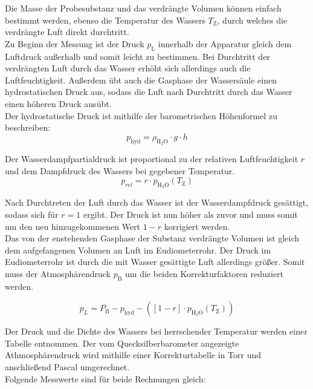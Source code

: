 \documentclass[12pt,a4paper,titlepage,headinclude,bibtotoc]{scrartcl}
\begin{document}
Die Masse der Probesubstanz und das verdrängte Volumen können einfach bestimmt werden, ebenso die Temperatur des Wassers $T_\mathrm{Z}$, durch welches die verdrängte Luft direkt durchtritt. \\
Zu Beginn der Messung ist der Druck $p_\mathrm{L}$ innerhalb der Apparatur gleich dem Luftdruck außerhalb und somit leicht zu bestimmen. Bei Durchtritt der verdrängten Luft durch das Wasser erhöht sich allerdings auch die Luftfeuchtigkeit. Außerdem übt auch die Gasphase der Wassersäule einen hydrostatischen Druck aus, sodass die Luft nach Durchtritt durch das Wasser einen höheren Druck ausübt. \\
Der hydrostatische Druck ist mithilfe der barometrischen Höhenformel zu beschreiben:\\

\begin{equation}
p_\mathrm{hyd}= \rho_\mathrm{H_2O} \cdot g \cdot h
\end{equation}

Der Wasserdampfpartialdruck ist proportional zu der relativen Luftfeuchtigkeit $r$ und dem Dampfdruck des Wassers bei gegebener Temperatur. \\

\begin{equation}
p_{rel} = r\cdot p_\mathrm{H_2O}(T_\mathrm{Z})
\end{equation}

Nach Durchtreten der Luft durch das Wasser ist der Wasserdampfdruck gesättigt, sodass sich für $r = 1$ ergibt. Der Druck ist nun höher als zuvor und muss somit um den neu hinzugekommenen Wert $1- r$ korrigiert werden. \\
Das von der enstehenden Gasphase der Substanz verdrängte Volumen ist gleich dem aufgefangenen Volumen an Luft im Eudiometerrohr. Der Druck im Eudiometerrohr ist durch die mit Wasser gesättigte Luft allerdings größer. Somit muss der Atmosphärendruck $p_\mathrm{B}$ um die beiden Korrekturfaktoren reduziert werden. 

\begin{equation}
p_L = P_\mathrm{B} - p_\mathrm{hyd} - ([1-r] \cdot p_\mathrm{H_2O}(T_\mathrm{Z}))
\end{equation}

Der Druck und die Dichte des Wassers bei herrschender Temperatur werden einer Tabelle entnommen. Der vom Quecksilberbarometer angezeigte Athmosphärendruck wird mithilfe einer Korrekturtabelle in Torr und anschließend Pascal umgerechnet.\\
Folgende Messwerte sind für beide Rechnungen gleich:\\
\end{document}
